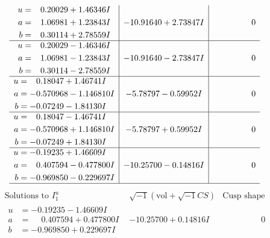 \documentclass[1p]{elsarticle_modified}
\theoremstyle{definition}
\newcommand{\I}{\sqrt{-1}}
\begin{document}
$$\begin{array}{c|c|c}
\begin{aligned}
u &= \phantom{-}0.20029 + 1.46346 I \\
a &= \phantom{-}1.06981 + 1.23843 I \\
b &= \phantom{-}0.30114 + 2.78559 I\end{aligned}
 & -10.91640 + 2.73847 I & \phantom{-0.000000 } 0 \\ \hline\begin{aligned}
u &= \phantom{-}0.20029 - 1.46346 I \\
a &= \phantom{-}1.06981 - 1.23843 I \\
b &= \phantom{-}0.30114 - 2.78559 I\end{aligned}
 & -10.91640 - 2.73847 I & \phantom{-0.000000 } 0 \\ \hline\begin{aligned}
u &= \phantom{-}0.18047 + 1.46741 I \\
a &= -0.570968 - 1.146810 I \\
b &= -0.07249 - 1.84130 I\end{aligned}
 & -5.78797 - 0.59952 I & \phantom{-0.000000 } 0 \\ \hline\begin{aligned}
u &= \phantom{-}0.18047 - 1.46741 I \\
a &= -0.570968 + 1.146810 I \\
b &= -0.07249 + 1.84130 I\end{aligned}
 & -5.78797 + 0.59952 I & \phantom{-0.000000 } 0 \\ \hline\begin{aligned}
u &= -0.19235 + 1.46609 I \\
a &= \phantom{-}0.407594 - 0.477800 I \\
b &= -0.969850 - 0.229697 I\end{aligned}
 & -10.25700 - 0.14816 I & \phantom{-0.000000 } 0\\
 \hline 
 \end{array}$$\newpage$$\begin{array}{c|c|c}  
\text{Solutions to }I^u_{1}& \I (\text{vol} + \sqrt{-1}CS) & \text{Cusp shape}\\
 \hline 
\begin{aligned}
u &= -0.19235 - 1.46609 I \\
a &= \phantom{-}0.407594 + 0.477800 I \\
b &= -0.969850 + 0.229697 I\end{aligned}
 & -10.25700 + 0.14816 I & \phantom{-0.000000 } 0 \\ \hline\begin{aligned}

\end{aligned}
\end{array}$$
\end{document}
